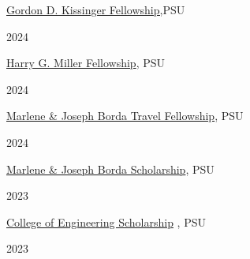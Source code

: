\documentclass[]{Keval-resume}
\begin{document}
{{\begin{minipage}[t]{.95\textwidth}
	\textbullet{}  {\href{https://sites.psu.edu/sbslab/2025/01/06/sbs-lab-member-viswanathan-ganesh-receives-two-fellowships/}{Gordon D. Kissinger Fellowship,}PSU} 
\end{minipage}%
\begin{minipage}[t]{.05\textwidth}
	\hfill 2024
\end{minipage}
\begin{minipage}[t]{.95\textwidth}
	\textbullet{}  {\href{https://sites.psu.edu/sbslab/2025/01/06/sbs-lab-member-viswanathan-ganesh-receives-two-fellowships/}{Harry G. Miller Fellowship}, PSU} 
\end{minipage}%
\begin{minipage}[t]{.05\textwidth}
	\hfill 2024
\end{minipage}
\begin{minipage}[t]{.95\textwidth}
	\textbullet{} {\href{https://sites.psu.edu/sbslab/2024/10/24/sbs-team-attends-american-modelica-conference-at-university-of-conneticut/}{Marlene \& Joseph Borda Travel Fellowship}, PSU} 
\end{minipage}%
\begin{minipage}[t]{.05\textwidth}
	\hfill 2024
\end{minipage}

\begin{minipage}[t]{.95\textwidth}
	\textbullet{}  {\href{https://sites.psu.edu/sbslab/2023/10/23/sbs-lab-member-viswanathan-ganesh-receives-prestigous-scholarships/}{Marlene \& Joseph Borda Scholarship}, PSU} 
\end{minipage}%
\begin{minipage}[t]{.05\textwidth}
	\hfill 2023
\end{minipage}
\begin{minipage}[t]{.95\textwidth}
	\textbullet{}  {\href{https://sites.psu.edu/sbslab/2023/10/23/sbs-lab-member-viswanathan-ganesh-receives-prestigous-scholarships/}{College of Engineering Scholarship} , PSU} 
\end{minipage}%
\begin{minipage}[t]{.05\textwidth}
	\hfill 2023
\end{minipage}

}}
\end{document}
